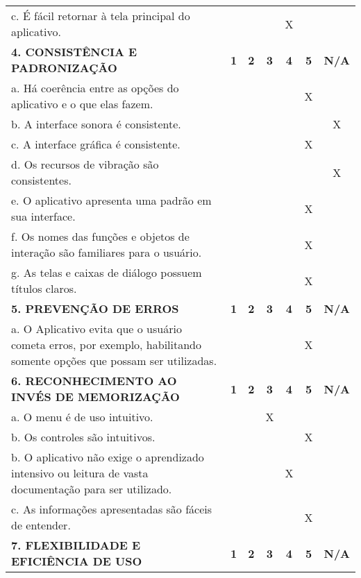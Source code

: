 \documentclass[portuguese,oneside]{tcc}
\begin{document}
\begin{center}
\begin{longtabu}{|L{25em}|c|c|c|c|c|c|}
																		c. É fácil retornar à tela principal do aplicativo. & & & & X & & \\ 
																		\textbf{4. CONSISTÊNCIA E PADRONIZAÇÃO} & \textbf{1} & \textbf{2} & \textbf{3} & \textbf{4} & \textbf{5} & \textbf{N/A} \\ 
																		a. Há coerência entre as opções do aplicativo e o que elas fazem. & & & & & X & \\ 
																		b. A interface sonora é consistente. & & & & & & X \\ 
																		c. A interface gráfica é consistente. & & & & & X & \\ 
																		d. Os recursos de vibração são consistentes. & & & & & & X \\ 
																		e. O aplicativo apresenta uma padrão em sua interface. & & & & & X & \\ 
																		f. Os nomes das funções e objetos de interação são familiares para o usuário. & & & & & X & \\ 
																		g. As telas e caixas de diálogo possuem títulos claros. & & & & & X & \\ 
																		\textbf{5. PREVENÇÃO DE ERROS} & \textbf{1} & \textbf{2} & \textbf{3} & \textbf{4} & \textbf{5} & \textbf{N/A} \\ 
																		a. O Aplicativo evita que o usuário cometa erros, por exemplo, habilitando somente opções que possam ser utilizadas. & & & & & X & \\ 
																		\textbf{6. RECONHECIMENTO AO INVÉS DE MEMORIZAÇÃO} & \textbf{1} & \textbf{2} & \textbf{3} & \textbf{4} & \textbf{5} & \textbf{N/A} \\ 
																		a. O  menu é de uso intuitivo. & & & X & & & \\ 
																		b. Os controles são intuitivos. & & & & & X & \\ 
																		b. O aplicativo não exige o aprendizado intensivo ou leitura de vasta documentação para ser utilizado. & & & & X & & \\ 
																		c. As informações apresentadas são fáceis de entender. & & & & & X & \\ 
																		\textbf{7. FLEXIBILIDADE E EFICIÊNCIA DE USO} & \textbf{1} & \textbf{2} & \textbf{3} & \textbf{4} & \textbf{5} & \textbf{N/A} \\ 

\end{longtabu}
\end{center}
\end{document}

